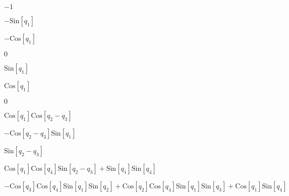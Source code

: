 \documentclass{article}
\begin{document}
\begin{doublespace}
\noindent\(-1\)
\end{doublespace}

\begin{doublespace}
\noindent\(-\text{Sin}\left[q_1\right]\)
\end{doublespace}

\begin{doublespace}
\noindent\(-\text{Cos}\left[q_1\right]\)
\end{doublespace}

\begin{doublespace}
\noindent\(0\)
\end{doublespace}

\begin{doublespace}
\noindent\(\text{Sin}\left[q_1\right]\)
\end{doublespace}

\begin{doublespace}
\noindent\(\text{Cos}\left[q_1\right]\)
\end{doublespace}

\begin{doublespace}
\noindent\(0\)
\end{doublespace}

\begin{doublespace}
\noindent\(\text{Cos}\left[q_1\right] \text{Cos}\left[q_2-q_3\right]\)
\end{doublespace}

\begin{doublespace}
\noindent\(-\text{Cos}\left[q_2-q_3\right] \text{Sin}\left[q_1\right]\)
\end{doublespace}

\begin{doublespace}
\noindent\(\text{Sin}\left[q_2-q_3\right]\)
\end{doublespace}

\begin{doublespace}
\noindent\(\text{Cos}\left[q_1\right] \text{Cos}\left[q_4\right] \text{Sin}\left[q_2-q_3\right]+\text{Sin}\left[q_1\right] \text{Sin}\left[q_4\right]\)
\end{doublespace}

\begin{doublespace}
\noindent\(-\text{Cos}\left[q_3\right] \text{Cos}\left[q_4\right] \text{Sin}\left[q_1\right] \text{Sin}\left[q_2\right]+\text{Cos}\left[q_2\right]
\text{Cos}\left[q_4\right] \text{Sin}\left[q_1\right] \text{Sin}\left[q_3\right]+\text{Cos}\left[q_1\right] \text{Sin}\left[q_4\right]\)
\end{doublespace}
\end{document}
